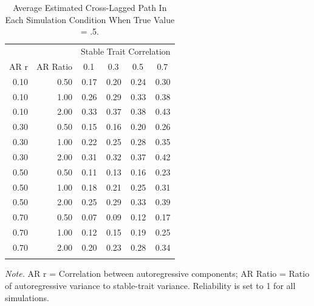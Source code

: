 \documentclass[
  english,
  man,floatsintext]{apa6}
\begin{document}
\begin{table}[tbp]

\begin{center}
\begin{threeparttable}

\caption{\label{tab:truePaths}Average Estimated Cross-Lagged Path In Each Simulation Condition When True Value = .5.}

\begin{tabular}{rrrrrr}
\toprule
 &  & \multicolumn{4}{c}{Stable Trait Correlation} \\
\cmidrule(r){3-6}
AR r & \multicolumn{1}{c}{AR Ratio} & \multicolumn{1}{c}{0.1} & \multicolumn{1}{c}{0.3} & \multicolumn{1}{c}{0.5} & \multicolumn{1}{c}{0.7}\\
\midrule
0.10 & 0.50 & 0.17 & 0.20 & 0.24 & 0.30\\
0.10 & 1.00 & 0.26 & 0.29 & 0.33 & 0.38\\
0.10 & 2.00 & 0.33 & 0.37 & 0.38 & 0.43\\ \midrule
0.30 & 0.50 & 0.15 & 0.16 & 0.20 & 0.26\\
0.30 & 1.00 & 0.22 & 0.25 & 0.28 & 0.35\\
0.30 & 2.00 & 0.31 & 0.32 & 0.37 & 0.42\\ \midrule
0.50 & 0.50 & 0.11 & 0.13 & 0.16 & 0.23\\
0.50 & 1.00 & 0.18 & 0.21 & 0.25 & 0.31\\
0.50 & 2.00 & 0.25 & 0.29 & 0.33 & 0.39\\ \midrule
0.70 & 0.50 & 0.07 & 0.09 & 0.12 & 0.17\\
0.70 & 1.00 & 0.12 & 0.15 & 0.19 & 0.25\\
0.70 & 2.00 & 0.20 & 0.23 & 0.28 & 0.34\\
\bottomrule
\addlinespace
\end{tabular}

\begin{tablenotes}[para]
\normalsize{\textit{Note.} AR r = Correlation between autoregressive components; AR Ratio = Ratio of autoregressive variance to stable-trait variance. Reliability is set to 1 for all simulations.}
\end{tablenotes}

\end{threeparttable}
\end{center}

\end{table}
\end{document}

